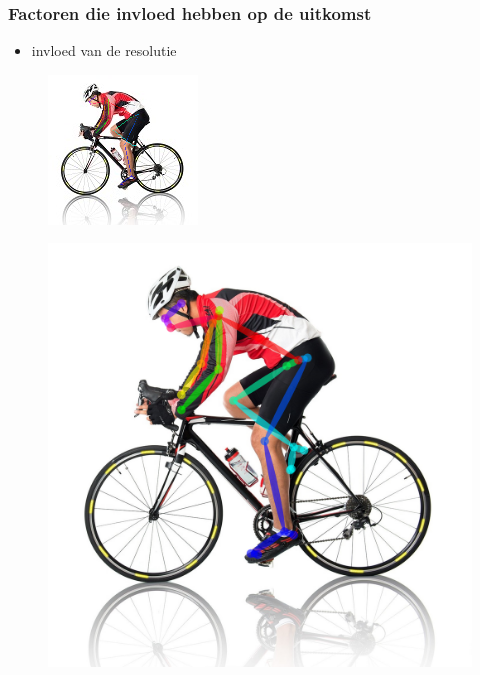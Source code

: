 \documentclass
   [kulak] %
   {kulakbeamer}
\begin{document}
\begin{frame}
	\frametitle{Factoren die invloed hebben op de uitkomst}
	\begin{itemize}
		\item invloed van de resolutie
	\end{itemize}
	\begin{figure}
		\begin{minipage}[b]{.5\linewidth}
			\centering\includegraphics[width= \textwidth]{150x150}
			\label{fig:1a}
		\end{minipage}%
		\begin{minipage}[b]{.5\linewidth}
			\centering\includegraphics[width= \textwidth]{1500x1500}

\end{minipage}
\end{figure}
\end{frame}
\end{document}
